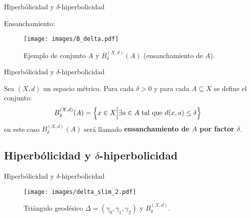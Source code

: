 \documentclass[xcolor=dvipsnames]{beamer}
\theoremstyle{largebreak}
\begin{document}
\begin{frame}{Hiperbólicidad y $\delta$-hiperbolicidad}
    \begin{center}
        Ensanchamiento:
    \end{center}
    \begin{figure}
        \begin{center}
            \texttt{[image: images/B\_delta.pdf]}
        \end{center}
        \caption{Ejemplo de conjunto $A$ y $B_\delta^{(X,d)}(A)$ (ensanchamiento de $A$).}
    \end{figure}
\end{frame}

\begin{frame}{Hiperbólicidad y $\delta$-hiperbolicidad}
    \begin{mydef}
        Sea $(X,d)$ un espacio métrico. Para cada $\delta>0$ y para cada $A\subseteq X$ se define el conjunto:
        \begin{equation*}
            B_\delta^{(X,d)}(A)=\left\{x\in X\Big|\exists a\in A\textup{ tal que }d(x,a)\leq\delta \right\}
        \end{equation*}
        en este caso $B_\delta^{(X,d)}(A)$ será llamado \textbf{ensanchamiento de $A$ por factor $\delta$}.
    \end{mydef}
\end{frame}

\subsection{Hiperbólicidad y $\delta$-hiperbolicidad}

\begin{frame}{Hiperbólicidad y $\delta$-hiperbolicidad}
    \begin{figure}
        \begin{center}
            \texttt{[image: images/delta\_slim\_2.pdf]}
        \end{center}
        \caption{Triángulo geodésico $\Delta=(\gamma_0,\gamma_1,\gamma_2)$ y $B_\delta^{(X,d)}$.}
    \end{figure}
\end{frame}
\end{document}
